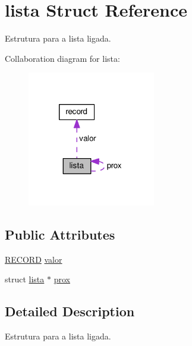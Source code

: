 \hypertarget{structlista}{\section{lista Struct Reference}
\label{structlista}
}


Estrutura para a lista ligada.  




Collaboration diagram for lista\+:\nopagebreak
\begin{figure}[H]
\begin{center}
\leavevmode
\includegraphics[width=158pt]{structlista__coll__graph}
\end{center}
\end{figure}
\subsection*{Public Attributes}
\begin{DoxyCompactItemize}
\item 
\hyperlink{stack_8c_a44e8f2943831641ea8ac9a833b65f08c}{R\+E\+C\+O\+R\+D} \hyperlink{structlista_a852a031ffa1734cf1750f54248f70bba}{valor}
\item 
struct \hyperlink{structlista}{lista} $\ast$ \hyperlink{structlista_a3b0e375147c1163d74544fd206a1f1de}{prox}
\end{DoxyCompactItemize}


\subsection{Detailed Description}
Estrutura para a lista ligada. 

